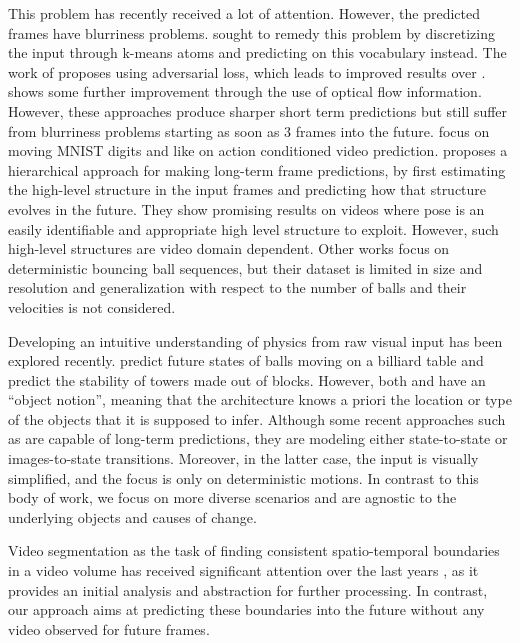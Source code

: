  This problem has  recently received a lot of attention. However, the predicted frames have blurriness problems. \cite{ranzato2014video} sought to remedy this problem by discretizing the input through k-means atoms and predicting on this vocabulary instead. The work of \cite{mathieu2015deep} proposes using adversarial loss, which leads to improved results over \cite{ranzato2014video}. \cite{liang2017dual,liu2017video,patraucean2015spatio} shows some further improvement through the use of optical flow information. However, these approaches produce sharper short term predictions but still suffer from blurriness problems starting as soon as 3 frames into the future. \cite{kalchbrenner2016video} focus on moving MNIST digits and like \cite{finn2016unsupervised} on action conditioned video prediction.  \cite{villegas2017learning} proposes a hierarchical approach for making long-term frame predictions, by first estimating the high-level structure in the input frames and predicting how that structure evolves in the future. They show promising results on videos where pose is an easily identifiable and appropriate high level structure to exploit. However, such high-level structures are video domain dependent. Other works  \cite{sutskever2009recurrent,michalski2014modeling} focus on deterministic bouncing ball sequences, but their dataset is limited in size and resolution and generalization with respect to the number of balls and their velocities is not considered.

 Developing an intuitive understanding of physics from raw visual input has been explored recently. \cite{fragkiadaki2015learning} predict future states of balls moving on a billiard table and \cite{lerer2016learning,li2016fall} predict the stability of towers made out of blocks.  However, both \cite{fragkiadaki2015learning} and \cite{lerer2016learning} have an ``object notion'', meaning that the architecture knows a priori the location or type of the objects that  it is supposed to infer. Although some recent approaches such as \cite{battaglia2016interaction,watters2017visual} are capable of long-term predictions, they are modeling either state-to-state or images-to-state transitions. Moreover, in the latter case, the input is visually simplified, and the focus is only on deterministic motions. In contrast to this body of work, we focus on  more diverse scenarios and are agnostic to the underlying objects and causes of change. 

 Video segmentation as the task of finding consistent spatio-temporal boundaries in a video volume has received significant attention over the last years \cite{galasso2014spectral,ochs2014segmentation,galasso2013unified,chang2013video}, as it provides an initial analysis and abstraction for further processing. In contrast, our approach aims at predicting these boundaries into the future without any video observed for  future frames. %
